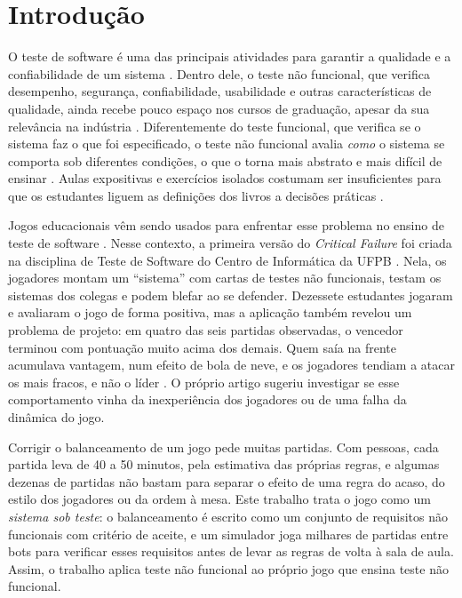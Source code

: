 \section{Introdução}
\label{sec:introducao}

O teste de software é uma das principais atividades para garantir a qualidade e a confiabilidade de um
sistema \cite{delamaro2016}. Dentro dele, o teste não funcional, que verifica desempenho, segurança,
confiabilidade, usabilidade e outras características de qualidade, ainda recebe pouco espaço nos cursos de
graduação, apesar da sua relevância na indústria \cite{garousi2020}. Diferentemente do teste funcional, que
verifica se o sistema faz o que foi especificado, o teste não funcional avalia \emph{como} o sistema se comporta
sob diferentes condições, o que o torna mais abstrato e mais difícil de ensinar \cite{paschoal2018}. Aulas
expositivas e exercícios isolados costumam ser insuficientes para que os estudantes liguem as definições dos
livros a decisões práticas \cite{valle2015,vanhanen2018}.

Jogos educacionais vêm sendo usados para enfrentar esse problema no ensino de teste de software
\cite{costa2024debug,gomes2021gamut,beppe2018greatest,jesus2020}. Nesse contexto, a primeira versão do
\emph{Critical Failure} foi criada na disciplina de Teste de Software do Centro de Informática da UFPB
\cite{oliveira2025critical}. Nela, os jogadores montam um ``sistema'' com cartas de testes não funcionais, testam
os sistemas dos colegas e podem blefar ao se defender. Dezessete estudantes jogaram e avaliaram o jogo de forma
positiva, mas a aplicação também revelou um problema de projeto: em quatro das seis partidas observadas, o
vencedor terminou com pontuação muito acima dos demais. Quem saía na frente acumulava vantagem, num efeito de
bola de neve, e os jogadores tendiam a atacar os mais fracos, e não o líder \cite{oliveira2025critical}. O próprio artigo sugeriu
investigar se esse comportamento vinha da inexperiência dos jogadores ou de uma falha da dinâmica do jogo.

Corrigir o balanceamento de um jogo pede muitas partidas. Com pessoas, cada partida leva de 40 a 50
minutos, pela estimativa das próprias regras, e
algumas dezenas de partidas não bastam para separar o efeito de uma regra do acaso, do estilo dos jogadores ou
da ordem à mesa. Este trabalho trata o jogo como um \emph{sistema sob teste}: o balanceamento é escrito como um
conjunto de requisitos não funcionais com critério de aceite, e um simulador joga milhares de partidas entre
bots para verificar esses requisitos antes de levar as regras de volta à sala de aula. Assim, o trabalho aplica
teste não funcional ao próprio jogo que ensina teste não funcional.

